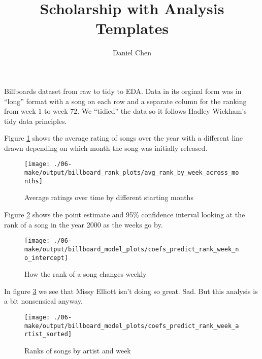 \documentclass[10pt,letterpaper]{article}
\author{Daniel Chen}
\title{Scholarship with Analysis Templates}
\date{}
\begin{document}
\maketitle

Billboards dataset from raw to tidy to EDA.
Data in its orginal form was in ``long'' format with a song on each row and a separate column
for the ranking from week 1 to week 72.
We ``tidied'' the data so it follows Hadley Wickham's tidy data principles.

Figure \ref{fig:avgrankbyweekacrossmonths} shows the average rating of songs
over the year with a different line drawn depending on which month the song was initially released.

\begin{figure}[H]
    \centering
    \texttt{[image: ./06-make/output/billboard\_rank\_plots/avg\_rank\_by\_week\_across\_months]}
    \caption[]{Average ratings over time by different starting months}
    \label{fig:avgrankbyweekacrossmonths}
\end{figure}

Figure \ref{fig:coefspredictrankweeknointercept} shows the point estimate and 95\% confidence interval looking at the rank of a song in the year 2000 as the weeks go by.

\begin{figure}[H]
    \centering
    \texttt{[image: ./06-make/output/billboard\_model\_plots/coefs\_predict\_rank\_week\_no\_intercept]}
    \caption[]{How the rank of a song changes weekly}
    \label{fig:coefspredictrankweeknointercept}
\end{figure}

In figure \ref{fig:coefspredictrankweekartistsorted} we see that Missy Elliott isn't doing so great.
Sad.
But this analysis is a bit nonsensical anyway.

\begin{figure}[H]
    \centering
    \texttt{[image: ./06-make/output/billboard\_model\_plots/coefs\_predict\_rank\_week\_artist\_sorted]}
    \caption{Ranks of songs by artist and week}
    \label{fig:coefspredictrankweekartistsorted}
\end{figure}
\end{document}

